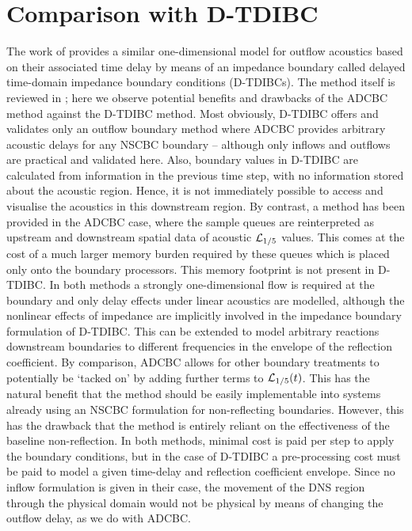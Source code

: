 \section{Comparison with D-TDIBC}

The work of \cite{douasbin2018DelayedtimeDomainImpedance} provides a similar one-dimensional model for outflow acoustics based on their associated time delay by means of an impedance boundary called delayed time-domain impedance boundary conditions (D-TDIBCs). The method itself is reviewed in ; here we observe potential benefits and drawbacks of the ADCBC method against the D-TDIBC method. Most obviously, D-TDIBC offers and validates only an outflow boundary method where ADCBC provides arbitrary acoustic delays for any NSCBC boundary -- although only inflows and outflows are practical and validated here. Also, boundary values in D-TDIBC are calculated from information in the previous time step, with no information stored about the acoustic region. Hence, it is not immediately possible to access and visualise the acoustics in this downstream region. By contrast, a method has been provided in the ADCBC case, where the sample queues are reinterpreted as upstream and downstream spatial data of acoustic $\mathcal{L}_{1/5}$ values. This comes at the cost of a much larger memory burden required by these queues which is placed only onto the boundary processors. This memory footprint is not present in D-TDIBC. In both methods a strongly one-dimensional flow is required at the boundary and only delay effects under linear acoustics are modelled, although the nonlinear effects of impedance are implicitly involved in the impedance boundary formulation of D-TDIBC. This can be extended to model arbitrary reactions downstream boundaries to different frequencies in the envelope of the reflection coefficient. By comparison, ADCBC allows for other boundary treatments to potentially be `tacked on' by adding further terms to $\mathcal{L}_{1/5}(t)$. This has the natural benefit that the method should be easily implementable into systems already using an NSCBC formulation for non-reflecting boundaries. However, this has the drawback that the method is entirely reliant on the effectiveness of the baseline non-reflection. In both methods, minimal cost is paid per step to apply the boundary conditions, but in the case of D-TDIBC a pre-processing cost must be paid to model a given time-delay and reflection coefficient envelope. Since no inflow formulation is given in their case, the movement of the DNS region through the physical domain would not be physical by means of changing the outflow delay, as we do with ADCBC.




